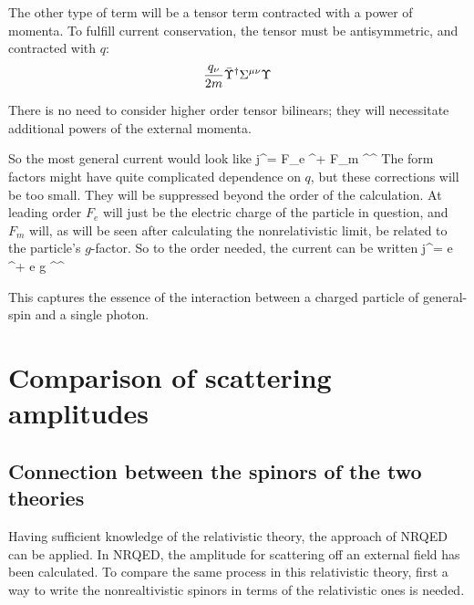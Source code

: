 The other type of term will be a tensor term contracted with a power of momenta.  To fulfill current conservation, the tensor must be antisymmetric, and contracted with $q$:
\[
	\frac{q_\nu}{2m} \bar{\Upsilon}^\dagger \Sigma^{\mu\nu} \Upsilon
\]

There is no need to consider higher order tensor bilinears; they will necessitate additional powers of the external momenta.

So the most general current would look like
\beq \label{eq:khr_current}
	j^\mu = F_e  \Psigbar^\dagger \Psig + F_m 	 \Psigbar^\dagger \TensBi^{\mu\nu} \Psig	
\eeq
The form factors might have quite complicated dependence on $q$, but these corrections will be too small.  They will be suppressed beyond the order of the calculation.  At leading order $F_e$ will just be the electric charge of the particle in question, and $F_m$ will, as will be seen after calculating the nonrelativistic limit, be related to the particle's $g$-factor.  So to the order needed, the current can be written
\beq 
	j^\mu =  e  \Psigbar^\dagger \Psig +   e g  \Psigbar^\dagger \TensBi^{\mu\nu} \Psig
\eeq


This captures the essence of the interaction between a charged particle of general-spin and a single photon.


\section{Comparison of scattering amplitudes}

\subsection{Connection between the spinors of the two theories}
Having sufficient knowledge of the relativistic theory, the approach of NRQED can be applied.  In NRQED, the amplitude for scattering off an external field has been calculated.  To compare the same process in this relativistic theory, first a way to write the nonrealtivistic spinors in terms of the relativistic ones is needed.

